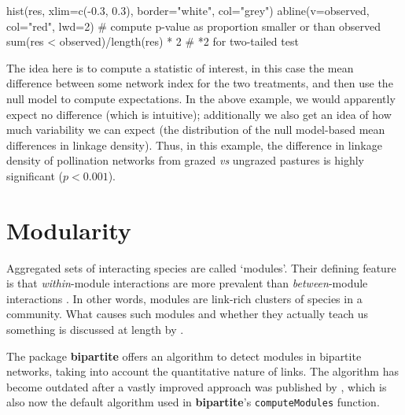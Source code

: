 \documentclass[a4paper, 11pt]{article}\usepackage[]{graphicx}\usepackage[]{color}
\newcommand{\package}[1]{\textbf{#1}}
\newcommand{\code}[1]{\texttt{#1}}
\begin{document}
%
\begin{Schunk}
\begin{Sinput}
hist(res, xlim=c(-0.3, 0.3), border="white", col="grey")
abline(v=observed, col="red", lwd=2)
# compute p-value as proportion smaller or than observed
sum(res < observed)/length(res) * 2 # *2 for two-tailed test
\end{Sinput}
\end{Schunk}
%
The idea here is to compute a statistic of interest, in this case the mean difference between some network index for the two treatments, and then use the null model to compute expectations. In the above example, we would apparently expect no difference (which is intuitive); additionally we also get an idea of how much variability we can expect (the distribution of the null model-based mean differences in linkage density). Thus, in this example, the difference in linkage density of pollination networks from grazed \emph{vs} ungrazed pastures is highly significant ($p<0.001$).


\section{Modularity}
Aggregated sets of interacting species are called `modules'. Their defining feature is that \emph{within}-module interactions are more prevalent than \emph{between}-module interactions \citep{Newman2003,Newman2004,Fortunato2010}. In other words, modules are link-rich clusters of species in a community. What causes such modules and whether they actually teach us something is discussed at length by \citet{Dormann2017AREES}. 

The package \package{bipartite} offers an algorithm \citep[QuaBiMo, described in technical detail in][]{Dormann2014} to detect modules in bipartite networks, taking into account the quantitative nature of links. The algorithm has become outdated after a vastly improved approach was published by \citet{Beckett2016}, which is also now the default algorithm used in \package{bipartite}'s \code{computeModules} function.
\end{document}
